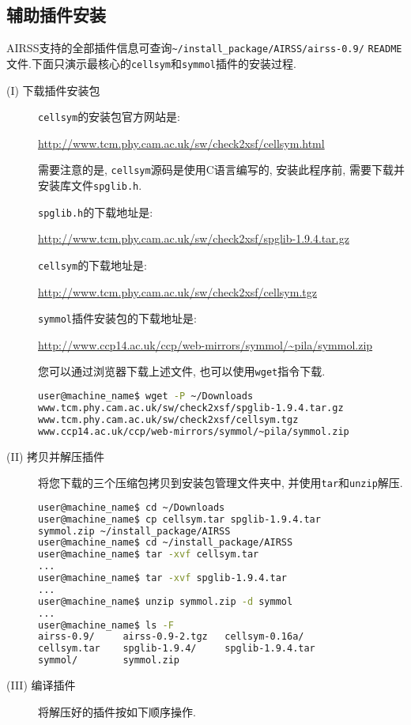 \documentclass[a4paper, 10pt]{article}
\begin{document}
\subsection{辅助插件安装}
AIRSS支持的全部插件信息可查询\verb|~/install_package/AIRSS/airss-0.9/|
\verb|README|文件.下面只演示最核心的\verb|cellsym|和\verb|symmol|插件的安装过程.
\begin{description}
\item[(I) 下载插件安装包]
\verb|cellsym|的安装包官方网站是:

\url{http://www.tcm.phy.cam.ac.uk/sw/check2xsf/cellsym.html}

需要注意的是, \verb|cellsym|源码是使用C语言编写的, 安装此程序前, 需要下载并安装库文件\verb|spglib.h|.

\verb|spglib.h|的下载地址是:

\url{http://www.tcm.phy.cam.ac.uk/sw/check2xsf/spglib-1.9.4.tar.gz}

\verb|cellsym|的下载地址是:

\url{http://www.tcm.phy.cam.ac.uk/sw/check2xsf/cellsym.tgz}

\verb|symmol|插件安装包的下载地址是:

\url{http://www.ccp14.ac.uk/ccp/web-mirrors/symmol/~pila/symmol.zip}

您可以通过浏览器下载上述文件, 也可以使用\verb|wget|指令下载.
\begin{lstlisting}[language={bash}]
user@machine_name$ wget -P ~/Downloads 
www.tcm.phy.cam.ac.uk/sw/check2xsf/spglib-1.9.4.tar.gz 
www.tcm.phy.cam.ac.uk/sw/check2xsf/cellsym.tgz 
www.ccp14.ac.uk/ccp/web-mirrors/symmol/~pila/symmol.zip
\end{lstlisting}

\item[(II) 拷贝并解压插件]将您下载的三个压缩包拷贝到安装包管理文件夹中, 并使用\verb|tar|和\verb|unzip|解压.
\begin{lstlisting}[language={bash}]
user@machine_name$ cd ~/Downloads
user@machine_name$ cp cellsym.tar spglib-1.9.4.tar 
symmol.zip ~/install_package/AIRSS
user@machine_name$ cd ~/install_package/AIRSS
user@machine_name$ tar -xvf cellsym.tar
...
user@machine_name$ tar -xvf spglib-1.9.4.tar
...
user@machine_name$ unzip symmol.zip -d symmol
...
user@machine_name$ ls -F
airss-0.9/     airss-0.9-2.tgz   cellsym-0.16a/  
cellsym.tar    spglib-1.9.4/     spglib-1.9.4.tar  
symmol/        symmol.zip
\end{lstlisting}

\item[(III) 编译插件]将解压好的插件按如下顺序操作.


\end{description}
\end{document}
